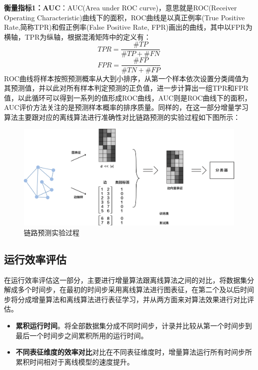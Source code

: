 \textbf{衡量指标1：AUC}：AUC(Area under ROC curve)，意思就是ROC(Receiver Operating Characteristic)曲线下的面积，ROC曲线是以真正例率(True Positive Rate,简称TPR)和假正例率(False Positive Rate, FPR)画出的曲线，其中以FPR为横轴，TPR为纵轴，根据混淆矩阵中的定义有：
\begin{equation}
	TPR = \frac{\#TP}{\#TP+\#FN}
\end{equation}
\begin{equation}
FPR = \frac{\#FP}{\#TN+\#FP}
\end{equation}
ROC曲线将样本按照预测概率从大到小排序，从第一个样本依次设置分类阈值为其预测值，并以此对所有样本判定预测的正负值，进一步计算出一组TPR和FPR值，以此循环可以得到一系列的值形成ROC曲线，AUC则是ROC曲线下的面积，AUC评价方法关注的是预测样本概率的排序质量。同样的，在这一部分增量学习算法主要跟对应的离线算法进行准确性对比链路预测的实验过程如下图所示：
\begin{figure}
	\centering
	\includegraphics[width=6in]{figures/link_predict_frame}
	\caption{链路预测实验过程}
\end{figure}

\subsection{运行效率评估}
在运行效率评估这一部分，主要进行增量算法跟离线算法之间的对比，将数据集分解成多个时间步，在最初的时间步采用离线算法进行图表征，在第二个及以后时间步将分成增量算法和离线算法进行表征学习，并从两方面来对算法效果进行对比评估。
\begin{itemize}
	\item \textbf{累积运行时间}。将全部数据集分成不同时间步，计录并比较从第一个时间步到最后一个时间步之间累积所用的运行时间。
	\item \textbf{不同表征维度的效率对比}对比在不同表征维度时，增量算法运行所有时间步所累积时间相对于离线模型的速度提升。 
\end{itemize}




